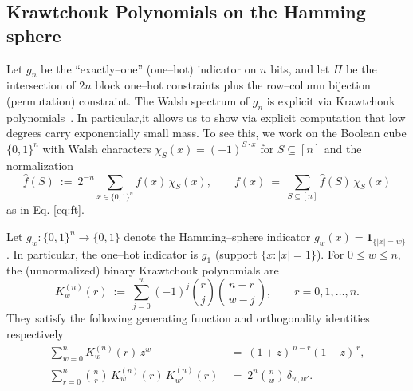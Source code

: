 \documentclass[a4paper,onecolumn,11pt,unpublished]{quantumarticle}
\theoremstyle{remark}
\begin{document}



 
\subsection{Krawtchouk Polynomials on the Hamming sphere}
\label{sec:kraw}
Let $g_n$ be the “exactly–one” (one–hot) indicator on \(n\) bits, and let
\(\Pi\) be the intersection of \(2n\) block one–hot constraints plus the
row–column bijection (permutation) constraint. The Walsh spectrum of $g_n$ is explicit via Krawtchouk polynomials~\cite{feinsilver2007,ODonnell2014}. In particular,it allows us to show via explicit computation that low degrees carry
exponentially small mass. To see this, we work on the Boolean cube $\{0,1\}^n$ with Walsh characters $\chi_S(x)=(-1)^{S\cdot x}$ for $S\subseteq[n]$
and the normalization
\[
  \widehat f(S)\ :=\ 2^{-n}\sum_{x\in\{0,1\}^n} f(x)\,\chi_S(x),
  \qquad
  f(x)\ =\ \sum_{S\subseteq[n]} \widehat f(S)\,\chi_S(x)
\]
as in Eq. \ref{eq:ft}.

\medskip
\noindent
Let $g_w:\{0,1\}^n\to\{0,1\}$ denote the Hamming–sphere indicator $g_w(x)=\mathbf{1}_{\{|x|=w\}}$.
In particular, the one–hot indicator is $g_1$ (support $\{x:|x|=1\}$). For $0\le w\le n$, the (unnormalized) binary Krawtchouk polynomials are
\begin{equation}
  K_w^{(n)}(r)\ :=\ \sum_{j=0}^{w}(-1)^j \binom{r}{j}\binom{n-r}{\,w-j\,},
  \qquad r=0,1,\dots,n.
  \label{eq:Kraw-def}
\end{equation}
They satisfy the following generating function and orthogonality identities respectively~\cite{feinsilver2007}
\begin{align}
  \sum_{w=0}^{n} K_w^{(n)}(r)\, z^w \ &=\ (1+z)^{\,n-r}(1-z)^{\,r}, \label{eq:Kraw-gen}\\
  \sum_{r=0}^{n} \binom{n}{r}\, K_w^{(n)}(r)\,K_{w'}^{(n)}(r) \ &=\ 2^{n}\binom{n}{w}\,\delta_{w,w'}.
  \label{eq:Kraw-orth}
\end{align}
\end{document}
